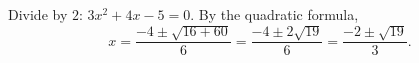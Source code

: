 Divide by $2$: $3x^2+4x-5=0$. By the quadratic formula,
\[x=\dfrac{-4\pm\sqrt{16+60}}{6}=\dfrac{-4\pm2\sqrt{19}}{6}=\boxed{\dfrac{-2\pm\sqrt{19}}{3}}.\]
